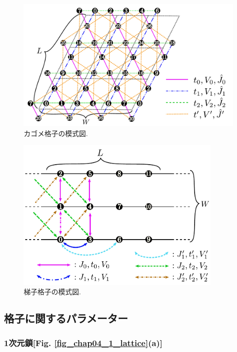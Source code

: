 \begin{itemize}
\begin{figure}[!htbp]
  \begin{center}
    \includegraphics[width=15cm]{../figs/kagome.pdf}
    \caption{カゴメ格子の模式図. 
    }
    \label{fig_kagome}
  \end{center}
\end{figure}

\begin{figure}[!htbp]
  \begin{center}
    \includegraphics[width=10cm]{../figs/ladder.pdf}
    \caption{梯子格子の模式図. 
    }
    \label{fig_ladder}
  \end{center}
\end{figure}

\end{itemize}

\subsection{格子に関するパラメーター}

\subsubsection{1次元鎖[Fig. \ref{fig_chap04_1_lattice}(a)]}

